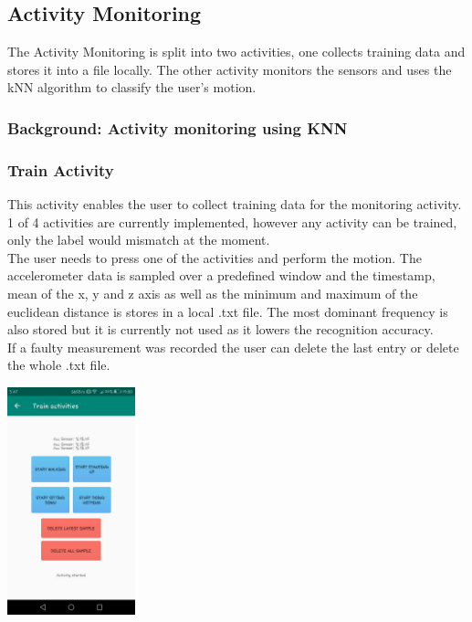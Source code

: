 \documentclass[12pt]{article}
\begin{document}
\subsection{Activity Monitoring}
The Activity Monitoring is split into two activities, one collects training data and stores it into a file locally. The other activity monitors the sensors and uses the kNN algorithm to classify the user's motion.

\subsubsection{Background: Activity monitoring using KNN}

\subsubsection{Train Activity} \label{sec:train}
This activity enables the user to collect training data for the monitoring activity. 1 of 4 activities are currently implemented, however any activity can be trained, only the label would mismatch at the moment.
\\
The user needs to press one of the activities and perform the motion. The accelerometer data is sampled over a predefined window and the timestamp, mean of the x, y and z axis as well as the minimum and maximum of the euclidean distance is stores in a local .txt file. The most dominant frequency is also stored but it is currently not used as it lowers the recognition accuracy.
\\
If a faulty measurement was recorded the user can delete the last entry or delete the whole .txt file.

\begin{center}
  \includegraphics[width=140px]{images/train_activity}
\end{center}

\pagebreak
 
\end{document}

